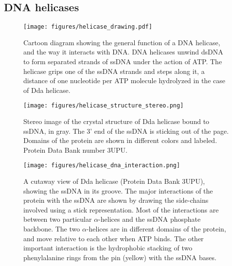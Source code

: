 \subsection{DNA helicases}

\begin{figure}[h]
\begin{centering}
\texttt{[image: figures/helicase\_drawing.pdf]}
\caption[DNA helicase general function]{Cartoon diagram showing the general function of a DNA helicase, and the way it interacts with DNA.  DNA helicases unwind dsDNA to form separated strands of ssDNA under the action of ATP.  The helicase grips one of the ssDNA strands and steps along it, a distance of one nucleotide per ATP molecule hydrolyzed in the case of Dda helicase.}
\label{fig:helicase_drawing}
\end{centering}
\end{figure}

\begin{figure}[h]
\begin{centering}
\texttt{[image: figures/helicase\_structure\_stereo.png]}
\caption[Dda helicase structure]{Stereo image of the crystal structure of Dda helicase bound to ssDNA, in gray.  The 3' end of the ssDNA is sticking out of the page.  Domains of the protein are shown in different colors and labeled.  Protein Data Bank number 3UPU. \citep{He2012}}
\label{fig:helicase_stereo}
\end{centering}
\end{figure}

\begin{figure}[h]
\begin{centering}
\texttt{[image: figures/helicase\_dna\_interaction.png]}
\caption[Dda helicase: interactions with ssDNA]{A cutaway view of Dda helicase (Protein Data Bank 3UPU), showing the ssDNA in its groove.  The major interactions of the protein with the ssDNA are shown by drawing the side-chains involved using a stick representation.  Most of the interactions are between two particular $\alpha$-helices and the ssDNA phosphate backbone.  The two $\alpha$-helices are in different domains of the protein, and move relative to each other when ATP binds.  The other important interaction is the hydrophobic stacking of two phenylalanine rings from the pin (yellow) with the ssDNA bases.}
\label{fig:helicase_ssDNA_interactions}
\end{centering}
\end{figure}

